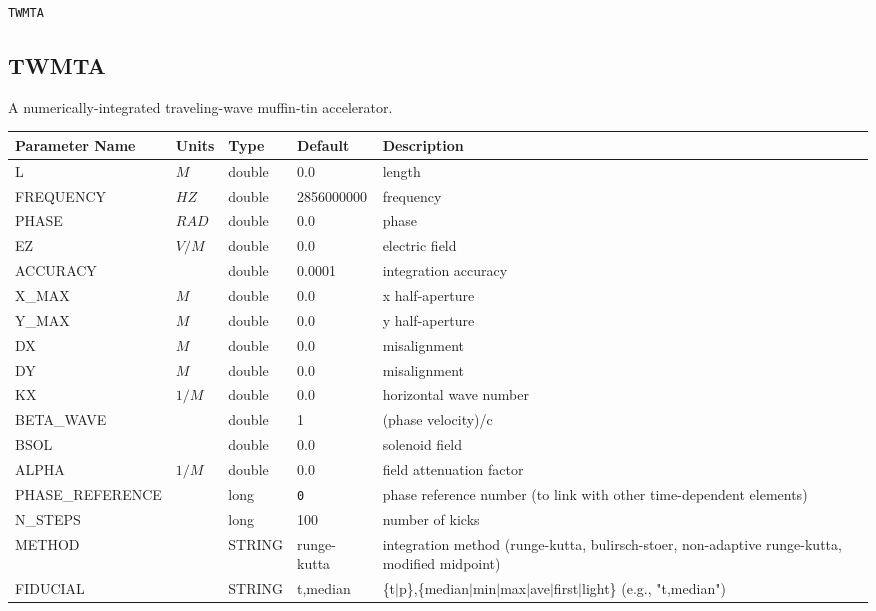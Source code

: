 \begin{latexonly}
\newpage
\begin{center}{\Large\verb|TWMTA|}\end{center}
\end{latexonly}\subsection{TWMTA}
A numerically-integrated traveling-wave muffin-tin accelerator.
\\
\begin{tabular}{|l|l|l|l|p{\descwidth}|} \hline
Parameter Name & Units & Type & Default & Description \\ \hline 
L & $M$ & double &  0.0 & length  \\ \hline 
FREQUENCY & $HZ$ & double &   2856000000 & frequency  \\ \hline 
PHASE & $RAD$ & double &  0.0 & phase  \\ \hline 
EZ & $V/M$ & double &  0.0 & electric field  \\ \hline 
ACCURACY &  & double &   0.0001 & integration accuracy  \\ \hline 
X\_MAX & $M$ & double &  0.0 & x half-aperture  \\ \hline 
Y\_MAX & $M$ & double &  0.0 & y half-aperture  \\ \hline 
DX & $M$ & double &  0.0 & misalignment  \\ \hline 
DY & $M$ & double &  0.0 & misalignment  \\ \hline 
KX & $1/M$ & double &  0.0 & horizontal wave number  \\ \hline 
BETA\_WAVE &  & double &   1 & (phase velocity)/c  \\ \hline 
BSOL &  & double &  0.0 & solenoid field  \\ \hline 
ALPHA & $1/M$ & double &  0.0 & field attenuation factor  \\ \hline 
PHASE\_REFERENCE &  & long &  \verb|0| & phase reference number (to link with other time-dependent elements)  \\ \hline 
N\_STEPS &  & long &   100             & number of kicks  \\ \hline 
METHOD & $ $ & STRING &   runge-kutta     & integration method (runge-kutta, bulirsch-stoer, non-adaptive runge-kutta, modified midpoint)  \\ \hline 
FIDUCIAL &  & STRING &   t,median        & \{t$|$p\},\{median$|$min$|$max$|$ave$|$first$|$light\} (e.g., "t,median")  \\ \hline 
\end{tabular}

